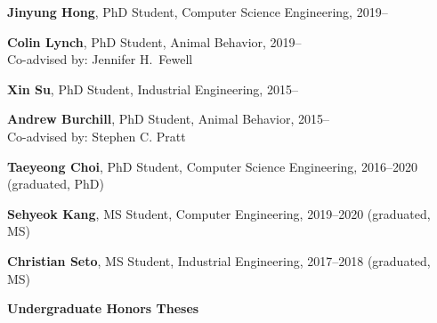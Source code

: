 \documentclass[10pt]{article}
\newcommand{\blankline}{\quad\pagebreak[3]}
\begin{document}
\begin{outerlist}

    \item \textbf{Jinyung Hong}, PhD Student, Computer Science
        Engineering, 2019--

    \item \textbf{Colin Lynch}, PhD Student, Animal Behavior, 2019--\\
        Co-advised by: Jennifer H.~Fewell


    \item \textbf{Xin Su}, PhD Student, Industrial Engineering, 2015--

    \item \textbf{Andrew Burchill}, PhD Student, Animal Behavior, 2015--\\
        Co-advised by: Stephen C. Pratt

    \item \textbf{Taeyeong Choi}, PhD Student, Computer Science Engineering, 2016--2020 (graduated, PhD)

    \item \textbf{Sehyeok Kang}, MS Student, Computer Engineering, 2019--2020 (graduated, MS)

    \item \textbf{Christian Seto}, MS Student, Industrial Engineering, 2017--2018 (graduated, MS)
\end{outerlist}

\blankline

\textbf{Undergraduate Honors Theses}
\end{document}
